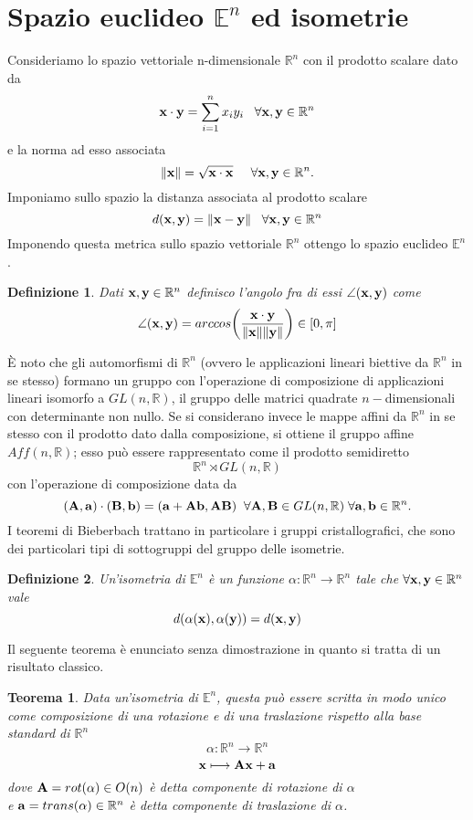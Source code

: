 \documentclass[a4paper]{book}
\newtheorem{definition}{Definizione}[section]
\newtheorem{theorem}{Teorema}[section]
\begin{document}
\section{Spazio euclideo $\mathbb{E}^n$ ed isometrie}
Consideriamo lo spazio vettoriale n-dimensionale $\mathbb{R}^{n}$  con il prodotto scalare dato da 
\[
  \vb{x} \cdot \vb{y} =  \sum_{i=1}^{n} x_i y_i    \; \; \; \forall \vb{x} , \vb{y} \in \mathbb{R}^{n}
\]
e la norma ad esso associata              
\[
  \norm{\vb{x}} =  \sqrt{\vb{x} \cdot \vb{x}}     \; \; \; \; \; \forall \vb{x} , \vb{y} \in \mathbb{R}^{n}.
\]
Imponiamo sullo spazio la distanza associata al prodotto scalare 
\[ d(\vb{x}, \vb{y} ) = \norm{\vb{x-y}}           \; \; \; \forall \vb{x} , \vb{y} \in \mathbb{R}^{n}\] 
Imponendo questa metrica sullo spazio vettoriale $\mathbb{R}^n$ ottengo lo spazio euclideo $\mathbb{E}^n$. 
\begin{definition}
Dati $\vb{x, y} \in \mathbb{R}^n$ definisco l'angolo fra di essi $\angle (\vb{x},\vb{y})$ come 
\[ \angle (\vb{x},\vb{y}) = arccos \bigg( \frac{\vb{x} \cdot \vb{y}}{\norm{\vb{x}} \norm{\vb{y}}} \bigg) \in [0, \pi] \]
\end{definition} 
\`E noto che gli automorfismi di $\mathbb{R}^n$ (ovvero le applicazioni lineari biettive da $\mathbb{R}^n$ in se stesso) formano un gruppo con l'operazione di composizione di applicazioni lineari isomorfo a $ GL(n, \mathbb{R}) $, il gruppo delle matrici quadrate $n-$dimensionali con determinante non nullo. 
Se si considerano invece le mappe affini da $\mathbb{R}^n$ in se stesso con il prodotto dato dalla composizione, si ottiene il gruppo affine $Aff(n, \mathbb{R})$; esso può essere rappresentato come il prodotto semidiretto 
\[  \mathbb{R}^{n} \rtimes GL(n, \mathbb{R})   \]
con l'operazione di composizione data da 
\[ (\vb{A, a}) \cdot (\vb{B, b}) = (\vb{ a + Ab, AB})  \; \; \forall \vb{A, B}  \in  GL(n, \mathbb{R}) \; \forall \vb{a, b} \in \mathbb{R}^n. \]
I teoremi di Bieberbach trattano in particolare i gruppi cristallografici, che sono dei particolari tipi di sottogruppi del gruppo delle isometrie.
\begin{definition}
	Un'isometria di $\mathbb{E}^n$  è un funzione $ \alpha : \mathbb{R}^{n} \longrightarrow \mathbb{R}^{n} $  tale che $\forall \vb{x,y} \in \mathbb{R}^n $ vale 
	\[ d(\alpha(\vb{x}), \alpha(\vb{y})) = d(\vb{x} , \vb{y} )\]
\end{definition} Il seguente teorema è enunciato senza dimostrazione in quanto si tratta di un risultato classico. 
\begin{theorem}
Data un'isometria di $\mathbb{E}^n $, questa può essere scritta in modo unico come composizione di una rotazione e di una traslazione rispetto alla base standard di $\mathbb{R}^n$
\[ \alpha : \mathbb{R}^{n} \longrightarrow \mathbb{R}^{n} \]
\[\vb{x} \longmapsto \vb{Ax + a} \]
dove $\vb{A} = rot( \alpha ) \in O(n) $ è detta componente di rotazione di $\alpha$ \\
e $\vb{a} = trans( \alpha ) \in \mathbb{R}^{n} $ è detta componente di traslazione di $\alpha$. 
\end{theorem}
\end{document}
